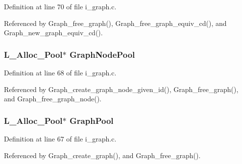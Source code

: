 Definition at line 70 of file i\_\-graph.c.

Referenced by Graph\_\-free\_\-graph(), Graph\_\-free\_\-graph\_\-equiv\_\-cd(), and Graph\_\-new\_\-graph\_\-equiv\_\-cd().
\subsubsection{\setlength{\rightskip}{0pt plus 5cm}\bf{L\_\-Alloc\_\-Pool}$\ast$ \bf{Graph\-Node\-Pool}}\label{i__graph_8h_558eb3b24249c2d9a5abb043b3955ee4}




Definition at line 68 of file i\_\-graph.c.

Referenced by Graph\_\-create\_\-graph\_\-node\_\-given\_\-id(), Graph\_\-free\_\-graph(), and Graph\_\-free\_\-graph\_\-node().
\subsubsection{\setlength{\rightskip}{0pt plus 5cm}\bf{L\_\-Alloc\_\-Pool}$\ast$ \bf{Graph\-Pool}}\label{i__graph_8h_76c884200585b70dd51bbbe5016d1722}




Definition at line 67 of file i\_\-graph.c.

Referenced by Graph\_\-create\_\-graph(), and Graph\_\-free\_\-graph().
